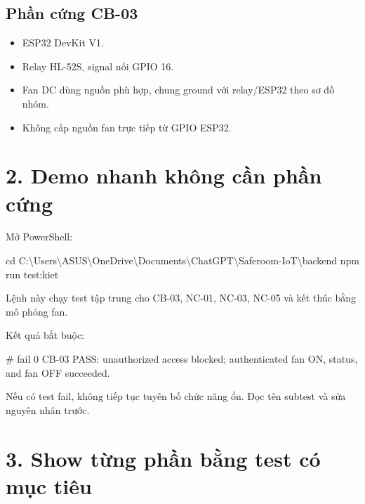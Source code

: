 \documentclass[11pt,oneside,openany]{book}
\newenvironment{Shaded}{\begin{snugshade}}{\end{snugshade}}
\newcommand{\FunctionTok}[1]{\textcolor[rgb]{0.56,0.27,0.68}{#1}}
\newcommand{\NormalTok}[1]{\textcolor[rgb]{0.81,0.81,0.76}{#1}}
\newcommand{\OperatorTok}[1]{\textcolor[rgb]{0.81,0.81,0.76}{#1}}
\renewenvironment{Shaded}{%
  \def\FrameCommand{\fboxsep=8pt\colorbox{shadecolor}}%
  \MakeFramed{\advance\hsize-\width\FrameRestore}%
}{\endMakeFramed}
\providecommand{\tightlist}{\setlength{\itemsep}{1pt}\setlength{\parskip}{0pt}}
\begin{document}
\subsection{Phần cứng CB-03}\label{phux1ea7n-cux1ee9ng-cb-03}

\begin{itemize}
\tightlist
\item
  ESP32 DevKit V1.
\item
  Relay HL-52S, signal nối GPIO 16.
\item
  Fan DC dùng nguồn phù hợp, chung ground với relay/ESP32 theo sơ đồ
  nhóm.
\item
  Không cấp nguồn fan trực tiếp từ GPIO ESP32.
\end{itemize}

\section{2. Demo nhanh không cần phần
cứng}\label{2-demo-nhanh-khuxf4ng-cux1ea7n-phux1ea7n-cux1ee9ng}

Mở PowerShell:

\begin{Shaded}
\begin{Highlighting}[]
\FunctionTok{cd}\NormalTok{ C}\OperatorTok{:}\NormalTok{\textbackslash{}Users\textbackslash{}ASUS\textbackslash{}OneDrive\textbackslash{}Documents\textbackslash{}ChatGPT\textbackslash{}Saferoom{-}IoT\textbackslash{}backend}
\NormalTok{npm run test}\OperatorTok{:}\NormalTok{kiet}
\end{Highlighting}
\end{Shaded}

Lệnh này chạy test tập trung cho CB-03, NC-01, NC-03, NC-05 và kết thúc
bằng mô phỏng fan.

Kết quả bắt buộc:

\begin{Shaded}
\begin{Highlighting}[]
\NormalTok{\# fail 0}
\NormalTok{CB{-}03 PASS: unauthorized access blocked; authenticated fan ON,}
\NormalTok{status, and fan OFF succeeded.}
\end{Highlighting}
\end{Shaded}

Nếu có test fail, không tiếp tục tuyên bố chức năng ổn. Đọc tên subtest
và sửa nguyên nhân trước.

\section{3. Show từng phần bằng test có mục
tiêu}\label{3-show-tux1eebng-phux1ea7n-bux1eb1ng-test-cuxf3-mux1ee5c-tiuxeau}
\end{document}
